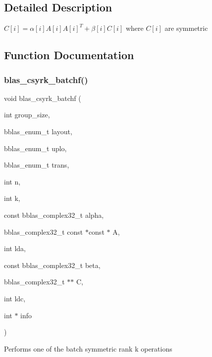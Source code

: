 \subsection{Detailed Description}
$ C[i] = \alpha[i] A[i] A[i]^T + \beta[i] C[i] $ where $ C[i] $ are symmetric 



\subsection{Function Documentation}
\mbox{\label{group__syrk__batchf_ga9febfef5913e417a169253881b64e423}} 
\subsubsection{\texorpdfstring{blas\+\_\+csyrk\+\_\+batchf()}{blas\_csyrk\_batchf()}}
{\footnotesize\ttfamily void blas\+\_\+csyrk\+\_\+batchf (\begin{DoxyParamCaption}\item[{int}]{group\+\_\+size,  }\item[{bblas\+\_\+enum\+\_\+t}]{layout,  }\item[{bblas\+\_\+enum\+\_\+t}]{uplo,  }\item[{bblas\+\_\+enum\+\_\+t}]{trans,  }\item[{int}]{n,  }\item[{int}]{k,  }\item[{const bblas\+\_\+complex32\+\_\+t}]{alpha,  }\item[{bblas\+\_\+complex32\+\_\+t const $\ast$const $\ast$}]{A,  }\item[{int}]{lda,  }\item[{const bblas\+\_\+complex32\+\_\+t}]{beta,  }\item[{bblas\+\_\+complex32\+\_\+t $\ast$$\ast$}]{C,  }\item[{int}]{ldc,  }\item[{int $\ast$}]{info }\end{DoxyParamCaption})}

Performs one of the batch symmetric rank k operations

